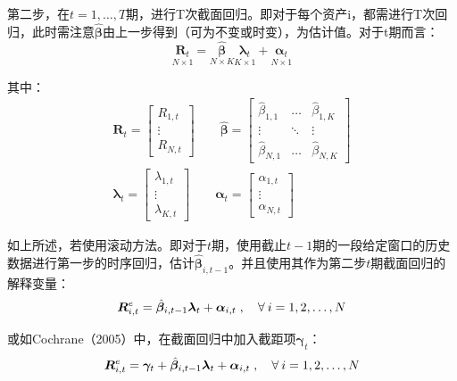 \documentclass[11pt]{article}
\begin{document}
第二步，在$t=1,\dots,T$期，进行T次截面回归。即对于每个资产i，都需进行T次回归，此时需注意$\hat{\bm{\beta}}$由上一步得到（可为不变或时变），为估计值。对于t期而言：
\begin{equation*}
    \underset{N \times 1}{\bm{R}_t} = \underset{N \times K}{\hat{\bm{\beta}}} \underset{ K \times 1}{\bm{\lambda}_t}  + \underset{N \times 1}{\bm{\alpha}_t}
\end{equation*}

其中：
\begin{gather*}
    \bm{R}_t = \begin{bmatrix}R_{1,t} \\ \vdots \\ R_{N,t}\end{bmatrix}
    \qquad 
    \hat{\bm{\beta}} = \begin{bmatrix} \hat{\beta}_{1,1} & \dots & \hat{\beta}_{1,K} \\ \vdots & \ddots & \vdots \\ \hat{\beta}_{N,1} & \dots & \hat{\beta}_{N,K} \end{bmatrix}
    \\
    \bm{\lambda}_t = \begin{bmatrix}\lambda_{1,t} \\ \vdots \\ \lambda_{K,t} \end{bmatrix}
    \qquad
    \bm{\alpha}_t = \begin{bmatrix}\alpha_{1,t} \\ \vdots \\ \alpha_{N,t} \end{bmatrix}
\end{gather*}

如上所述，若使用滚动方法。即对于$t$期，使用截止$t-1$期的一段给定窗口的历史数据进行第一步的时序回归，估计$\hat{\bm{\beta}}_{i,t-1}$。并且使用其作为第二步$t$期截面回归的解释变量：
\begin{equation*}
    \bm{R}_{i,t}^{e} = \hat{\bm{\beta}}_{i,t-1} \bm{\lambda}_t + \bm{\alpha}_{i,t} \inlinesep \forall i=1,2,\dots,N
\end{equation*}

或如Cochrane（2005）中，在截面回归中加入截距项$\bm{\gamma}_t$：
\begin{equation*}
    \bm{R}_{i,t}^{e} = \bm{\gamma}_t + \hat{\bm{\beta}}_{i,t-1} \bm{\lambda}_t + \bm{\alpha}_{i,t} \inlinesep \forall i=1,2,\dots,N
\end{equation*}
\end{document}
